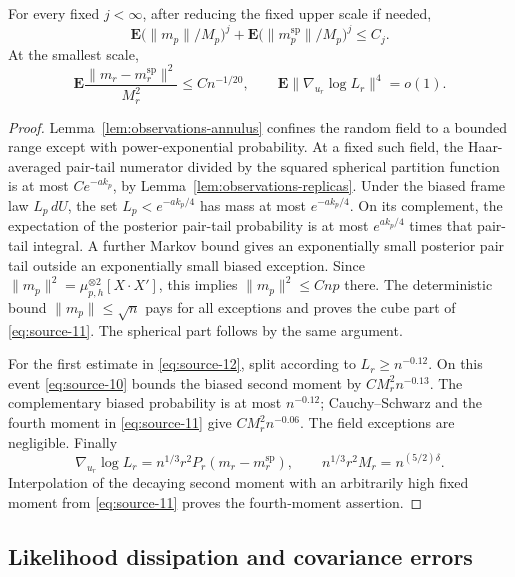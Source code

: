\begin{corollary}\label{cor:observations-means}
For every fixed $j<\infty$, after reducing the fixed upper scale if needed,
\begin{equation}\label{eq:source-11}
 \mathbf E\bigl(\|m_p\|/M_p\bigr)^j
 +\mathbf E\bigl(\|m_p^{\mathrm{sp}}\|/M_p\bigr)^j\le C_j.
\end{equation}
At the smallest scale,
\begin{equation}\label{eq:source-12}
 \mathbf E\frac{\|m_r-m_r^{\mathrm{sp}}\|^2}{M_r^2}
 \le Cn^{-1/20},\qquad
 \mathbf E\|\nabla_{u_r}\log L_r\|^4=o(1).
\end{equation}
\end{corollary}

\begin{proof}
Lemma~\ref{lem:observations-annulus} confines the random field to a bounded
range except with power-exponential probability. At a fixed such field,
the Haar-averaged pair-tail numerator divided by the squared spherical
partition function is at most $Ce^{-ak_p}$, by
Lemma~\ref{lem:observations-replicas}.
Under the biased frame law $L_p\,dU$, the set
$L_p<e^{-ak_p/4}$ has mass at most $e^{-ak_p/4}$. On its complement,
the expectation of the posterior pair-tail probability is at most
$e^{ak_p/4}$ times that pair-tail integral. A further Markov bound gives
an exponentially small posterior pair tail outside an exponentially small
biased exception. Since
$\|m_p\|^2=\mu_{p,h}^{\otimes2}[X\cdot X']$, this implies
$\|m_p\|^2\le Cnp$ there. The deterministic bound $\|m_p\|\le\sqrt n$
pays for all exceptions and proves the cube part of
\eqref{eq:source-11}. The spherical part follows by the same argument.

For the first estimate in \eqref{eq:source-12}, split according to
$L_r\ge n^{-0.12}$. On this event \eqref{eq:source-10} bounds the biased
second moment by $CM_r^2n^{-0.13}$. The complementary biased probability
is at most $n^{-0.12}$; Cauchy--Schwarz and the fourth moment in
\eqref{eq:source-11} give $CM_r^2n^{-0.06}$. The field exceptions are
negligible. Finally
\[
 \nabla_{u_r}\log L_r
 =n^{1/3}r^2 P_r(m_r-m_r^{\mathrm{sp}}),\qquad
 n^{1/3}r^2M_r=n^{(5/2)\delta}.
\]
Interpolation of the decaying second moment with an arbitrarily high fixed
moment from \eqref{eq:source-11} proves the fourth-moment assertion.
\end{proof}

\subsection{Likelihood dissipation and covariance errors}

